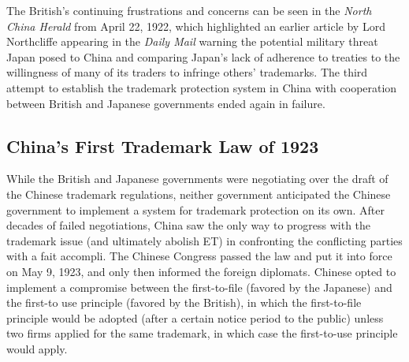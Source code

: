 \documentclass[12pt]{article}
\begin{document}
The British's continuing frustrations and concerns can be seen in the \emph{North China Herald} from April 22, 1922, which highlighted an earlier article by Lord Northcliffe appearing in the \emph{Daily Mail} warning the potential military threat Japan posed to China and comparing Japan’s lack of adherence to treaties to the willingness of many of its traders to infringe others' trademarks. The third attempt to establish the trademark protection system in China with cooperation between British and Japanese governments ended again in failure.

\subsection{China's First Trademark Law of 1923} \label{subsec:hist_trademarklaw} 

While the British and Japanese governments were negotiating over the draft of the Chinese trademark regulations, neither government anticipated the Chinese government to implement a system for trademark protection on its own. After decades of failed negotiations, China saw the only way to progress with the trademark issue (and ultimately abolish ET) in confronting the conflicting parties with a fait accompli. The Chinese Congress passed the law and put it into force on May 9, 1923, and only then informed the foreign diplomats. Chinese opted to implement a compromise between the first-to-file (favored by the Japanese) and the first-to use principle (favored by the British), in which the first-to-file principle would be adopted (after a certain notice period to the public) unless two firms applied for the same trademark, in which case the first-to-use principle would apply.  
\end{document}
